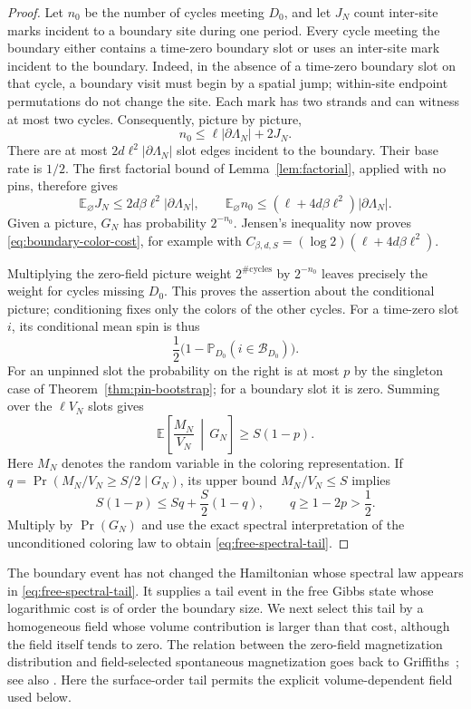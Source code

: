 \begin{proof}
Let \(n_0\) be the number of cycles meeting \(D_0\), and let \(J_N\)
count inter-site marks incident to a boundary site during one period.
Every cycle meeting the boundary either contains a time-zero boundary
slot or uses an inter-site mark incident to the boundary.  Indeed, in
the absence of a time-zero boundary slot on that cycle, a boundary visit
must begin by a spatial jump; within-site endpoint permutations do not
change the site.  Each mark has two strands and can witness at most two
cycles.  Consequently, picture by picture,
\[
 n_0\leq \ell|\partial\Lambda_N|+2J_N.
\]
There are at most \(2d\ell^2|\partial\Lambda_N|\) slot edges incident
to the boundary.  Their base rate is \(1/2\).  The first factorial
bound of Lemma~\ref{lem:factorial}, applied with no pins, therefore gives
\[
 \mathbb E_{\varnothing}J_N
 \leq 2d\beta\ell^2|\partial\Lambda_N|,
 \qquad
 \mathbb E_{\varnothing}n_0
 \leq(\ell+4d\beta\ell^2)|\partial\Lambda_N|.
\]
Given a picture, \(G_N\) has probability \(2^{-n_0}\).  Jensen's
inequality now proves \eqref{eq:boundary-color-cost}, for example with
\(C_{\beta,d,S}=(\log2)(\ell+4d\beta\ell^2)\).

Multiplying the zero-field picture weight \(2^{\#\mathrm{cycles}}\)
by \(2^{-n_0}\) leaves precisely the weight for cycles missing
\(D_0\).  This proves the assertion about the conditional picture;
conditioning fixes only the colors of the other cycles.  For a
time-zero slot \(i\), its conditional mean spin is thus
\[
 \frac12\bigl(1-\mathbb P_{D_0}(i\in\mathcal B_{D_0})\bigr).
\]
For an unpinned slot the probability on the right is at most \(p\) by
the singleton case of Theorem~\ref{thm:pin-bootstrap}; for a boundary
slot it is zero.  Summing over the \(\ell V_N\) slots gives
\[
 \mathbb E\left[\frac{M_N}{V_N}\,\middle|\,G_N\right]
       \geq S(1-p).
\]
Here \(M_N\) denotes the random variable in the coloring
representation.  If
\(q=\Pr(M_N/V_N\geq S/2\mid G_N)\), its upper bound \(M_N/V_N\leq S\)
implies
\[
 S(1-p)\leq Sq+\frac S2(1-q),\qquad q\geq1-2p>\frac12.
\]
Multiply by \(\Pr(G_N)\) and use the exact spectral interpretation
of the unconditioned coloring law to obtain
\eqref{eq:free-spectral-tail}.
\end{proof}

The boundary event has not changed the Hamiltonian whose spectral law
appears in \eqref{eq:free-spectral-tail}.  It supplies a tail event in
the free Gibbs state whose logarithmic cost is of order the boundary
size.  We next select this tail by a homogeneous field whose volume
contribution is larger than that cost, although the field itself tends
to zero.  The relation between the zero-field magnetization
distribution and field-selected spontaneous magnetization goes back to
Griffiths~\cite{Griffiths1966}; see also
\cite[Section~1]{DysonLiebSimon1978}.  Here the surface-order tail
permits the explicit volume-dependent field used below.

